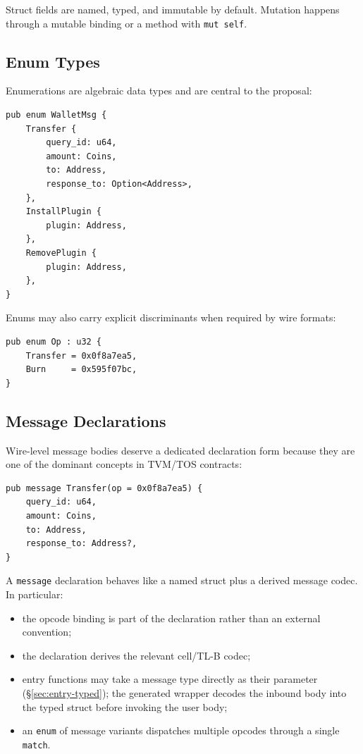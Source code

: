 \documentclass[12pt,oneside]{article}
\begin{document}
Struct fields are named, typed, and immutable by default. Mutation happens
through a mutable binding or a method with \verb|mut self|.

\subsection{Enum Types}
Enumerations are algebraic data types and are central to the proposal:

\begin{verbatim}
pub enum WalletMsg {
    Transfer {
        query_id: u64,
        amount: Coins,
        to: Address,
        response_to: Option<Address>,
    },
    InstallPlugin {
        plugin: Address,
    },
    RemovePlugin {
        plugin: Address,
    },
}
\end{verbatim}

Enums may also carry explicit discriminants when required by wire formats:

\begin{verbatim}
pub enum Op : u32 {
    Transfer = 0x0f8a7ea5,
    Burn     = 0x595f07bc,
}
\end{verbatim}

\subsection{Message Declarations}
\label{sec:message-decl}
Wire-level message bodies deserve a dedicated declaration form because they are
one of the dominant concepts in TVM/TOS contracts:

\begin{verbatim}
pub message Transfer(op = 0x0f8a7ea5) {
    query_id: u64,
    amount: Coins,
    to: Address,
    response_to: Address?,
}
\end{verbatim}

A \verb|message| declaration behaves like a named struct plus a derived message
codec. In particular:

\begin{itemize}
\item the opcode binding is part of the declaration rather than an external
convention;
\item the declaration derives the relevant cell/TL-B codec;
\item entry functions may take a message type directly as their
parameter (\S\ref{sec:entry-typed}); the generated wrapper decodes the
inbound body into the typed struct before invoking the user body;
\item an \verb|enum| of message variants dispatches multiple opcodes
through a single \verb|match|.
\end{itemize}
\end{document}
